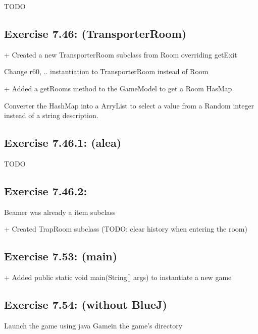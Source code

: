 \documentclass[twoside,french]{report}
\begin{document}
TODO

\subsection*{Exercise 7.46: (TransporterRoom)}

+ Created a new TransporterRoom subclass from Room overriding getExit

Change r60, .. instantiation to TransporterRoom instead of Room

+ Added a getRooms method to the GameModel to get a Room HasMap

Converter the HashMap into a ArryList to select a value from a Random integer instead of a string description.

\subsection*{Exercise 7.46.1: (alea)}

TODO

\subsection*{Exercise 7.46.2:}

Beamer was already a item subclass

+ Created TrapRoom subclass (TODO: clear history when entering the room)

\subsection*{Exercise 7.53: (main)}

+ Added public static void main(String[] args) to instantiate a new game

\subsection*{Exercise 7.54: (without BlueJ)}

Launch the game using \"java Game\" in the game's directory
\end{document}
